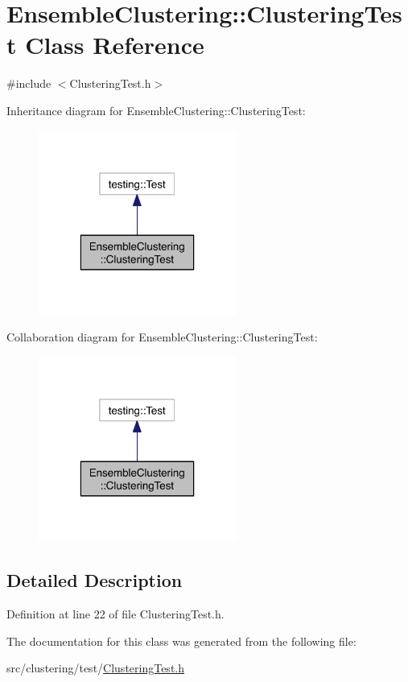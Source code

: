 \hypertarget{class_ensemble_clustering_1_1_clustering_test}{\section{Ensemble\-Clustering\-:\-:Clustering\-Test Class Reference}
\label{class_ensemble_clustering_1_1_clustering_test}
}


{\ttfamily \#include $<$Clustering\-Test.\-h$>$}



Inheritance diagram for Ensemble\-Clustering\-:\-:Clustering\-Test\-:\nopagebreak
\begin{figure}[H]
\begin{center}
\leavevmode
\includegraphics[width=184pt]{class_ensemble_clustering_1_1_clustering_test__inherit__graph}
\end{center}
\end{figure}


Collaboration diagram for Ensemble\-Clustering\-:\-:Clustering\-Test\-:\nopagebreak
\begin{figure}[H]
\begin{center}
\leavevmode
\includegraphics[width=184pt]{class_ensemble_clustering_1_1_clustering_test__coll__graph}
\end{center}
\end{figure}


\subsection{Detailed Description}


Definition at line 22 of file Clustering\-Test.\-h.



The documentation for this class was generated from the following file\-:\begin{DoxyCompactItemize}
\item 
src/clustering/test/\hyperlink{_clustering_test_8h}{Clustering\-Test.\-h}\end{DoxyCompactItemize}

